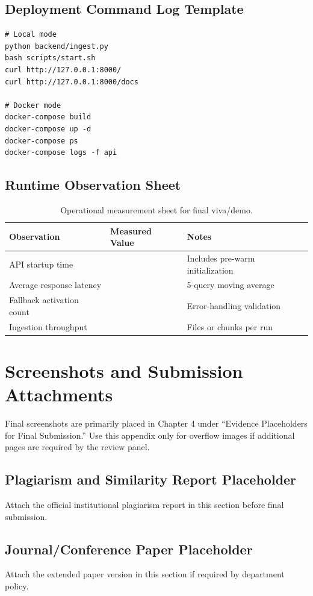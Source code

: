 \documentclass[12pt,letterpaper]{report}
\begin{document}
\section{Deployment Command Log Template}
\begin{verbatim}
# Local mode
python backend/ingest.py
bash scripts/start.sh
curl http://127.0.0.1:8000/
curl http://127.0.0.1:8000/docs

# Docker mode
docker-compose build
docker-compose up -d
docker-compose ps
docker-compose logs -f api
\end{verbatim}

\section{Runtime Observation Sheet}
\begin{table}[h]
\centering
\begin{tabular}{p{}p{}p{}}
\hline
\textbf{Observation} & \textbf{Measured Value} & \textbf{Notes} \\
\hline
API startup time & \underline{\hspace{2cm}} & Includes pre-warm initialization \\
Average response latency & \underline{\hspace{2cm}} & 5-query moving average \\
Fallback activation count & \underline{\hspace{2cm}} & Error-handling validation \\
Ingestion throughput & \underline{\hspace{2cm}} & Files or chunks per run \\
\hline
\end{tabular}
\caption{Operational measurement sheet for final viva/demo.}
\end{table}

\chapter{Screenshots and Submission Attachments}

\noindent Final screenshots are primarily placed in Chapter 4 under ``Evidence Placeholders for Final Submission.'' Use this appendix only for overflow images if additional pages are required by the review panel.

\section{Plagiarism and Similarity Report Placeholder}
\noindent Attach the official institutional plagiarism report in this section before final submission.

\section{Journal/Conference Paper Placeholder}
\noindent Attach the extended paper version in this section if required by department policy.
\end{document}
